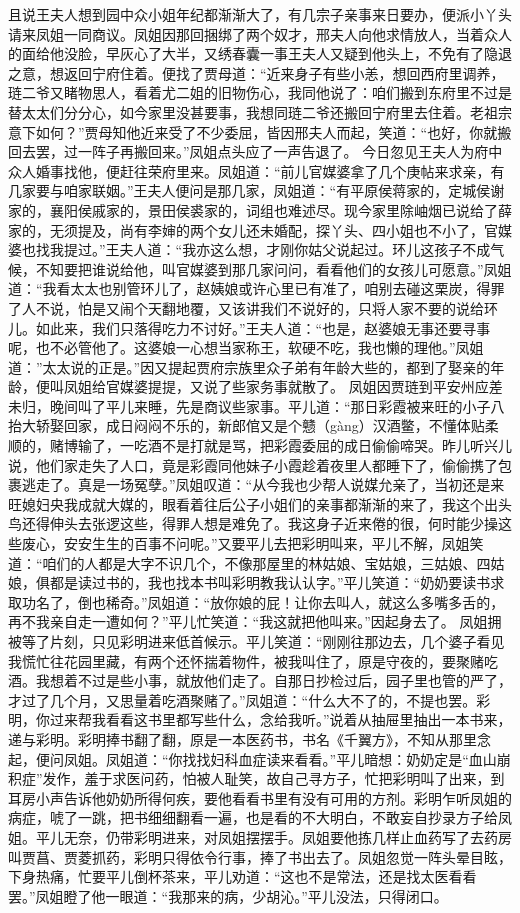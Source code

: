 \documentclass[12pt,oneside]{book}
\begin{document}
且说王夫人想到园中众小姐年纪都渐渐大了，有几宗子亲事来日要办，便派小丫头请来凤姐一同商议。凤姐因那回捆绑了两个奴才，邢夫人向他求情放人，当着众人的面给他没脸，早灰心了大半，又绣春囊一事王夫人又疑到他头上，不免有了隐退之意，想返回宁府住着。便找了贾母道：“近来身子有些小恙，想回西府里调养，琏二爷又睹物思人，看着尤二姐的旧物伤心，我同他说了：咱们搬到东府里不过是替太太们分分心，如今家里没甚要事，我想同琏二爷还搬回宁府里去住着。老祖宗意下如何？”贾母知他近来受了不少委屈，皆因邢夫人而起，笑道：“也好，你就搬回去罢，过一阵子再搬回来。”凤姐点头应了一声告退了。
今日忽见王夫人为府中众人婚事找他，便赶往荣府里来。凤姐道：“前儿官媒婆拿了几个庚帖来求亲，有几家要与咱家联姻。”王夫人便问是那几家，凤姐道：“有平原侯蒋家的，定城侯谢家的，襄阳侯戚家的，景田侯裘家的，词组也难述尽。现今家里除岫烟已说给了薛家的，无须提及，尚有李婶的两个女儿还未婚配，探丫头、四小姐也不小了，官媒婆也找我提过。”王夫人道：“我亦这么想，才刚你姑父说起过。环儿这孩子不成气候，不知要把谁说给他，叫官媒婆到那几家问问，看看他们的女孩儿可愿意。”凤姐道：“我看太太也别管环儿了，赵姨娘或许心里已有准了，咱别去碰这栗炭，得罪了人不说，怕是又闹个天翻地覆，又该讲我们不说好的，只将人家不要的说给环儿。如此来，我们只落得吃力不讨好。”王夫人道：“也是，赵婆娘无事还要寻事呢，也不必管他了。这婆娘一心想当家称王，软硬不吃，我也懒的理他。”凤姐道：”太太说的正是。”因又提起贾府宗族里众子弟有年龄大些的，都到了娶亲的年龄，便叫凤姐给官媒婆提提，又说了些家务事就散了。
凤姐因贾琏到平安州应差未归，晚间叫了平儿来睡，先是商议些家事。平儿道：“那日彩霞被来旺的小子八抬大轿娶回家，成日闷闷不乐的，新郎倌又是个戆（gàng）汉酒鳖，不懂体贴柔顺的，赌博输了，一吃酒不是打就是骂，把彩霞委屈的成日偷偷啼哭。昨儿听兴儿说，他们家走失了人口，竟是彩霞同他妹子小霞趁着夜里人都睡下了，偷偷携了包裹逃走了。真是一场冤孽。”凤姐叹道：“从今我也少帮人说媒允亲了，当初还是来旺媳妇央我成就大媒的，眼看着往后公子小姐们的亲事都渐渐的来了，我这个出头鸟还得伸头去张逻这些，得罪人想是难免了。我这身子近来倦的很，何时能少操这些废心，安安生生的百事不问呢。”又要平儿去把彩明叫来，平儿不解，凤姐笑道：“咱们的人都是大字不识几个，不像那屋里的林姑娘、宝姑娘，三姑娘、四姑娘，俱都是读过书的，我也找本书叫彩明教我认认字。”平儿笑道：“奶奶要读书求取功名了，倒也稀奇。”凤姐道：“放你娘的屁！让你去叫人，就这么多嘴多舌的，再不我亲自走一遭如何？”平儿忙笑道：“我这就把他叫来。”因起身去了。
凤姐拥被等了片刻，只见彩明进来低首候示。平儿笑道：“刚刚往那边去，几个婆子看见我慌忙往花园里藏，有两个还怀揣着物件，被我叫住了，原是守夜的，要聚赌吃酒。我想着不过是些小事，就放他们走了。自那日抄检过后，园子里也管的严了，才过了几个月，又思量着吃酒聚赌了。”凤姐道：“什么大不了的，不提也罢。彩明，你过来帮我看看这书里都写些什么，念给我听。”说着从抽屉里抽出一本书来，递与彩明。彩明捧书翻了翻，原是一本医药书，书名《千翼方》，不知从那里念起，便问凤姐。凤姐道：“你找找妇科血症读来看看。”平儿暗想：奶奶定是“血山崩积症”发作，羞于求医问药，怕被人耻笑，故自己寻方子，忙把彩明叫了出来，到耳房小声告诉他奶奶所得何疾，要他看看书里有没有可用的方剂。彩明乍听凤姐的病症，唬了一跳，把书细细翻看一遍，也是看的不大明白，不敢妄自抄录方子给凤姐。平儿无奈，仍带彩明进来，对凤姐摆摆手。凤姐要他拣几样止血药写了去药房叫贾菖、贾菱抓药，彩明只得依令行事，捧了书出去了。凤姐忽觉一阵头晕目眩，下身热痛，忙要平儿倒杯茶来，平儿劝道：“这也不是常法，还是找太医看看罢。”凤姐瞪了他一眼道：“我那来的病，少胡沁。”平儿没法，只得闭口。
\end{document}
